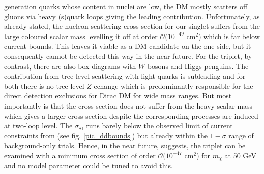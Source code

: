 generation
quarks whose content in nuclei are low, the DM mostly scatters off gluons via heavy (s)quark loops giving the leading contribution. Unfortunately,
as already stated, the nucleon scattering cross section for our singlet suffers from the large coloured scalar mass levelling it off at order 
$\mathcal{O}(10^{-49}$ cm$^2$) which is far below current bounds. This leaves it viable as a DM candidate on the one side, but it consequently cannot
be detected this way in the near future. For the triplet, by contrast, there are also box diagrams with $W$-bosons and Higgs penguins. The 
contribution
from tree level scattering with light quarks is subleading and for both there is no tree level $Z$-echange which is predominantly responsible
for the direct detection exclusions for Dirac DM for wide mass ranges. But most importantly is that the cross section does not suffer from the 
heavy scalar mass which gives a larger cross section despite the corresponding processes are induced at two-loop level. The $\sigma_\text{SI}$
runs barely below the observed limit of current constraints from \cite{1607.02475} (see fig. \ref{pic_ddbounds}) but already within the $1-\sigma$
range of background-only trials. Hence, in the near future, \cite{1512.07501} suggests, the triplet can be examined with a minimum cross section
of order $\mathcal{O}(10^{-47}$ cm$^2$) for $m_\chi$ at 50 GeV and no model parameter could be tuned to avoid this.\\
% 
% 
% 
% 
% 
% 

